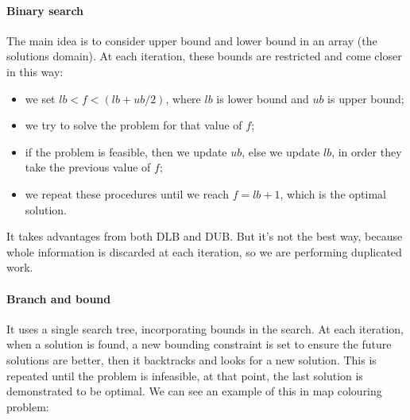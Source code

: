 \documentclass[10pt,a4paper]{article}
\begin{document}
\paragraph{Binary search}
The main idea is to consider upper bound and lower bound in an array (the
solutions domain). At each iteration, these bounds are restricted and come
closer in this way:
\begin{itemize}
    \item we set $lb < f < (lb + ub / 2)$, where $lb$ is lower bound and $ub$ is
    upper bound;
    \item we try to solve the problem for that value of $f$;
    \item if the problem is feasible, then we update $ub$, else we update $lb$,
    in order they take the previous value of $f$;
    \item we repeat these procedures until we reach $f = lb + 1$, which is the
    optimal solution.
\end{itemize}
It takes advantages from both DLB and DUB. But it's not the best way, because
whole information is discarded at each iteration, so we are performing
duplicated work.

\paragraph{Branch and bound}
It uses a single search tree, incorporating bounds in the search. At each
iteration, when a solution is found, a new bounding constraint is set to ensure
the future solutions are better, then it backtracks and looks for a new
solution. This is repeated until the problem is infeasible, at that point, the
last solution is demonstrated to be optimal. We can see an example of this in
map colouring problem:

\end{document}
